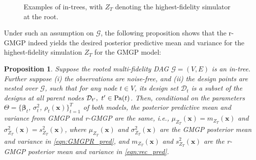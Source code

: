 \documentclass[12pt]{article}
\newtheorem{prop}{Proposition}
\newcommand{\bs}[1]{\boldsymbol{#1}}
\begin{document}
\begin{figure}[!t]
\begin{minipage}{0.3\textwidth}
\end{minipage}
\begin{minipage}{0.3\textwidth}
    \centering
\end{minipage}
\caption{Examples of in-trees, with $Z_T$ denoting the highest-fidelity simulator at the root.}
\label{fig:intree} 
\end{figure}
Under such an assumption on $\mathcal{G}$, the following proposition shows that the r-GMGP indeed yields the desired posterior predictive mean and variance for the highest-fidelity simulation $Z_T$ for the GMGP model:
\begin{prop}
Suppose the rooted multi-fidelity DAG $\mathcal{G} = (V,E)$ is an in-tree. Further suppose (i) the observations are noise-free, and (ii) the design points are nested over $\mathcal{G}$, such that for any node $t \in V$, its design set $\mathcal{D}_{t}$ is a subset of the designs at all parent nodes $\mathcal{D}_{t'},\ t' \in \textup{Pa}(t)$. Then, conditional on the parameters $\Theta=\{\bs{\beta}_t$, $\sigma^2_t$, $\rho_t(\bs{x})\}_{t=1}^{T}$ of both models, the posterior predictive mean and variance from GMGP and r-GMGP are the same, i.e., $\mu_{Z_T}(\bs{x}) = m_{Z_T}(\bs{x})$ and $\sigma^2_{Z_T}(\bs{x}) = s^2_{Z_T}(\bs{x})$, where $\mu_{Z_T}(\bs{x})$ and $\sigma^2_{Z_T}(\bs{x})$ are the GMGP posterior mean and variance in \eqref{eqn:GMGPR_pred}, and $m_{Z_T}(\bs{x})$ and $s^2_{Z_T}(\bs{x})$ are the r-GMGP posterior mean and variance in \eqref{eqn:rec_pred}.
\end{prop}
\end{document}
